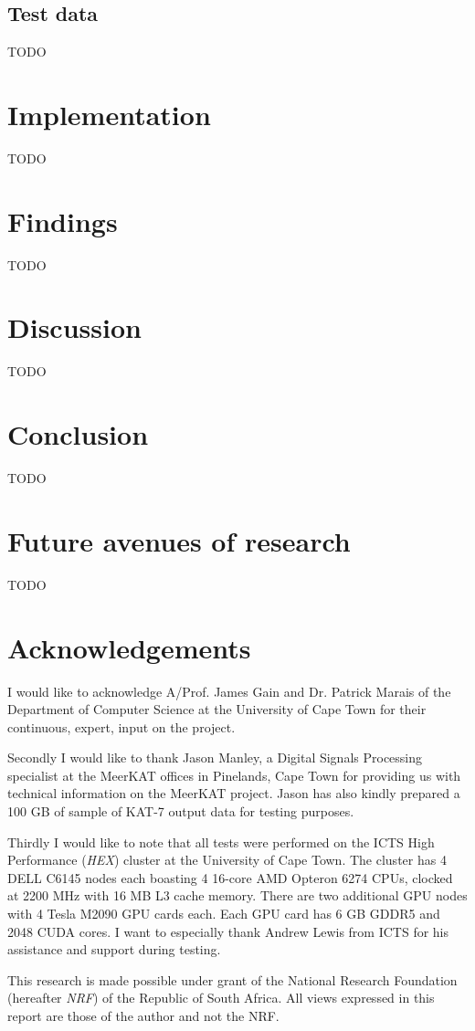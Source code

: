 \documentclass{acm_proc_article-sp}
\begin{document}
\subsection{Test data}
{\color{red}TODO}
\section{Implementation}
{\color{red}TODO}
\section{Findings}
{\color{red}TODO}
\section{Discussion}
{\color{red}TODO}
\section{Conclusion}
{\color{red}TODO}
\section{Future avenues of research}
{\color{red}TODO}
\section{Acknowledgements}
I would like to acknowledge A/Prof. James Gain and Dr. Patrick Marais of the Department of Computer Science at the University of Cape Town for their continuous, expert, input on the project.

Secondly I would like to thank Jason Manley, a Digital Signals Processing specialist at the MeerKAT offices in Pinelands, Cape Town for providing us with technical information
on the MeerKAT project. Jason has also kindly prepared a 100 GB of sample of KAT-7 output data for testing purposes.

Thirdly I would like to note that all tests were performed on the ICTS High Performance (\textit{HEX}) cluster at the University of Cape Town. The cluster has 4 DELL C6145 nodes each boasting 4 16-core
AMD Opteron 6274 CPUs, clocked at 2200 MHz with 16 MB L3 cache memory. There are two additional GPU nodes with 4 Tesla M2090 GPU cards each. Each GPU card has 6 GB GDDR5 and 2048 CUDA cores. I want to 
especially thank Andrew Lewis from ICTS for his assistance and support during testing.

This research is made possible under grant of the National Research Foundation (hereafter \textit{NRF}) of the Republic of South Africa. All views expressed in this report are those of the author and not the NRF.


\end{document}
